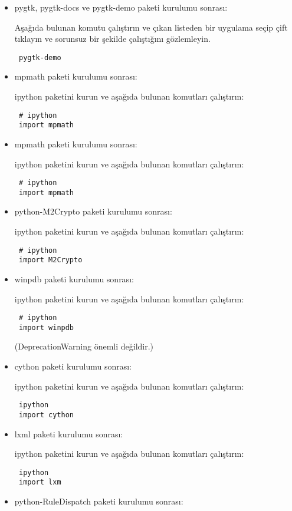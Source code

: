 \documentclass[a4paper,10pt]{article}
\begin{document}
\begin{itemize}
\item pygtk, pygtk-docs ve pygtk-demo paketi kurulumu sonrası: 

Aşağıda bulunan komutu çalıştırın ve çıkan listeden bir uygulama seçip çift tıklayın ve sorunsuz bir şekilde çalıştığını gözlemleyin.
\begin{verbatim}
 pygtk-demo
\end{verbatim}


\item mpmath paketi kurulumu sonrası:  

ipython paketini kurun ve aşağıda bulunan komutları çalıştırın:
\begin{verbatim}
 # ipython
 import mpmath
\end{verbatim}

\item mpmath paketi kurulumu sonrası:  

ipython paketini kurun ve aşağıda bulunan komutları çalıştırın:
\begin{verbatim}
 # ipython
 import mpmath
\end{verbatim}

\item python-M2Crypto paketi kurulumu sonrası:

ipython paketini kurun ve aşağıda bulunan komutları çalıştırın:
\begin{verbatim}
 # ipython
 import M2Crypto
\end{verbatim}

\item winpdb paketi kurulumu sonrası:

ipython paketini kurun ve aşağıda bulunan komutları çalıştırın:
\begin{verbatim}
 # ipython
 import winpdb
\end{verbatim}
(DeprecationWarning önemli değildir.)

\item cython paketi kurulumu sonrası:

ipython paketini kurun ve aşağıda bulunan komutları çalıştırın:
\begin{verbatim}
 ipython
 import cython
\end{verbatim}

\item lxml paketi kurulumu sonrası:  

ipython paketini kurun ve aşağıda bulunan komutları çalıştırın:
\begin{verbatim}
 ipython
 import lxm
\end{verbatim}
\item python-RuleDispatch paketi kurulumu sonrası:  


\end{itemize}
\end{document}
